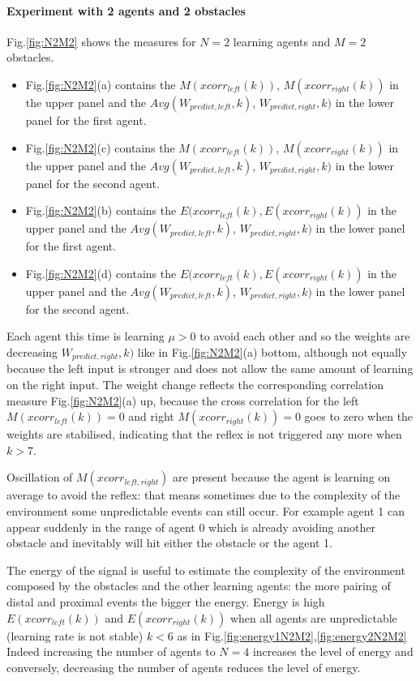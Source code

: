 \paragraph{Experiment with 2 agents and 2 obstacles}
Fig.\ref{fig:N2M2} shows the measures for $N=2$ learning agents and $M=2$ obstacles.
\begin{itemize}
 \item Fig.\ref{fig:N2M2}(a) contains the $M(xcorr_{left}(k))$, $M(xcorr_{right}(k))$ in the upper panel
and the $Avg(W_{predict,left},k)$, $W_{predict,right},k)$ in the lower panel for the first agent.
 \item Fig.\ref{fig:N2M2}(c) contains the $M(xcorr_{left}(k))$, $M(xcorr_{right}(k))$ in the upper panel
and the $Avg(W_{predict,left},k)$, $W_{predict,right},k)$ in the lower panel for the second agent.
\item Fig.\ref{fig:N2M2}(b) contains the $E(xcorr_{left}(k),E(xcorr_{right}(k))$ in the upper panel
and the $Avg(W_{predict,left},k)$, $W_{predict,right},k)$ in the lower panel for the first agent.
\item Fig.\ref{fig:N2M2}(d) contains the $E(xcorr_{left}(k),E(xcorr_{right}(k))$ in the upper panel
and the $Avg(W_{predict,left},k)$, $W_{predict,right},k)$ in the lower panel for the second agent.
\end{itemize}

Each agent this time is learning $\mu>0$ to avoid each other and so the weights are
decreasing $W_{predict,right},k)$ like in Fig.\ref{fig:N2M2}(a) bottom, although not equally
because the left input is stronger and does not allow the same amount of learning
on the right input.
The weight change reflects the  corresponding correlation measure Fig.\ref{fig:N2M2}(a) up,
because the cross correlation for the left $M(xcorr_{left}(k))=0$ and right $M(xcorr_{right}(k))=0$
goes to zero when the weights are stabilised, indicating that the reflex is not triggered
any more when $k>7$.

Oscillation of $M(xcorr_{left,right})$ are present because the agent is learning on average to avoid
the reflex: that means sometimes due to the complexity of the environment some
unpredictable events can still occur.
For example agent 1 can appear suddenly in the range of agent 0 which is already
avoiding another obstacle and inevitably will hit either the obstacle or the agent 1.

The energy of the signal is useful to estimate the complexity of the environment
composed by the obstacles and the other learning agents:
the more pairing of distal and proximal events the bigger the energy.
Energy is high $E(xcorr_{left}(k))$ and $E(xcorr_{right}(k))$ when all agents are unpredictable
(learning rate is not stable) $k<6$ as in Fig.\ref{fig:energy1N2M2},\ref{fig:energy2N2M2}
Indeed increasing the number of agents to $N=4$ increases the level of energy and conversely, 
decreasing the number of agents reduces the level of energy.

